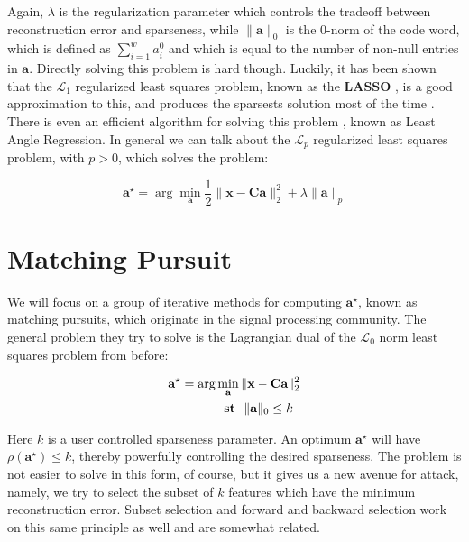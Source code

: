 \documentclass[12pt,a4paper,oneside,english]{UPBThesis}
\begin{document}
Again, $\lambda$ is the regularization parameter which controls the tradeoff between reconstruction error and sparseness, while $\|\textbf{a}\|_0$ is the $0$-norm of the code word, which is defined as $\sum_{i=1}^{w}a_i^0$ and which is equal to the number of non-null entries in $\textbf{a}$. Directly solving this problem is hard though. Luckily, it has been shown that the $\mathcal{L}_1$ regularized least squares problem, known as the \textbf{LASSO} \cite{lasso}, is a good approximation to this, and produces the sparsests solution most of the time \cite{undetermined-minimal-L1}. There is even an efficient algorithm for solving this problem \cite{least-angle-regression}, known as Least Angle Regression. In general we can talk about the $\mathcal{L}_p$ regularized least squares problem, with $p > 0$, which solves the problem:

\begin{equation*}
\textbf{a}^{\star} = \arg\min_{\textbf{a}} \frac{1}{2} \| \textbf{x} - \textbf{C}\textbf{a} \|_2^2 + \lambda \| \textbf{a} \|_p
\end{equation*}

\section{Matching Pursuit}
\label{sec:MatchingPursuit}

We will focus on a group of iterative methods for computing $\textbf{a}^\star$, known as matching pursuits, which originate in the signal processing community. The general problem they try to solve is the Lagrangian dual of the $\mathcal{L}_0$ norm least squares problem from before:

\begin{align*}
\textbf{a}^\star = \arg & \min_\textbf{a} \|\textbf{x} - \textbf{C}\textbf{a}\|_2^2 \\
& \text{~~\textbf{st}~~} \|\textbf{a}\|_0 \leq k
\end{align*}

Here $k$ is a user controlled sparseness parameter. An optimum $\textbf{a}^\star$ will have $\rho(\textbf{a}^\star) \leq k$, thereby powerfully controlling the desired sparseness. The problem is not easier to solve in this form, of course, but it gives us a new avenue for attack, namely, we try to select the subset of $k$ features which have the minimum reconstruction error. Subset selection and forward and backward selection work on this same principle as well and are somewhat related.
\end{document}
